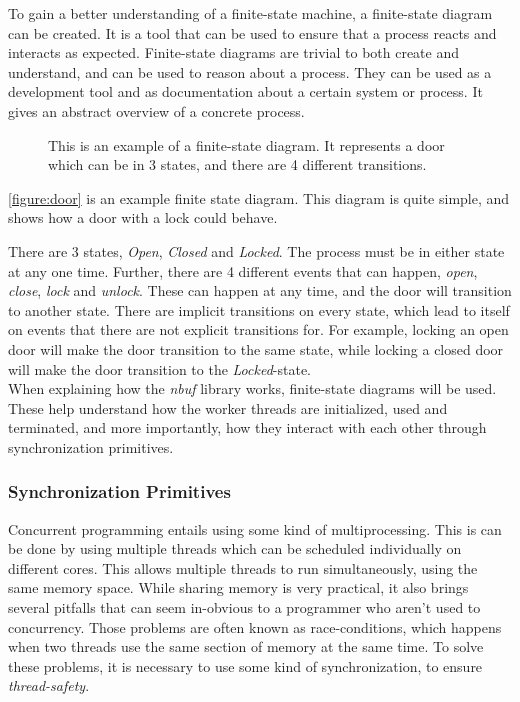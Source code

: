 \documentclass[a4paper]{article}
\newcommand{\nbuf}{\textit{nbuf} }
\begin{document}
To gain a better understanding of a finite-state machine, a finite-state diagram can be created. It is a tool that can be used to ensure that a process reacts and interacts as expected. Finite-state diagrams are trivial to both create and understand, and can be used to reason about a process. They can be used as a development tool and as documentation about a certain system or process. It gives an abstract overview of a concrete process.\\

\begin{figure}
	\begin{adjustwidth}{-0.5in}{-0.5in}
    \centering
    \def\svgwidth{\columnwidth}
    
  	\caption{This is an example of a finite-state diagram. It represents a door which can be in 3 states, and there are 4 different transitions.}
	\label{figure:door}
	\end{adjustwidth}
\end{figure}

\autoref{figure:door} is an example finite state diagram. This diagram is quite simple, and shows how a door with a lock could behave.

There are 3 states, \textit{Open}, \textit{Closed} and \textit{Locked}. The process must be in either state at any one time. Further, there are 4 different events that can happen, \textit{open}, \textit{close}, \textit{lock} and \textit{unlock}. These can happen at any time, and the door will transition to another state. There are implicit transitions on every state, which lead to itself on events that there are not explicit transitions for. For example, locking an open door will make the door transition to the same state, while locking a closed door will make the door transition to the \textit{Locked}-state.\\

When explaining how the \nbuf library works, finite-state diagrams will be used. These help understand how the worker threads are initialized, used and terminated, and more importantly, how they interact with each other through synchronization primitives.


\subsubsection{Synchronization Primitives}
Concurrent programming entails using some kind of multiprocessing. This is can be done by using multiple threads which can be scheduled individually on different cores. This allows multiple threads to run simultaneously, using the same memory space. While sharing memory is very practical, it also brings several pitfalls that can seem in-obvious to a programmer who aren't used to concurrency. Those problems are often known as race-conditions, which happens when two threads use the same section of memory at the same time. To solve these problems, it is necessary to use some kind of synchronization, to ensure \textit{thread-safety}.
\end{document}
